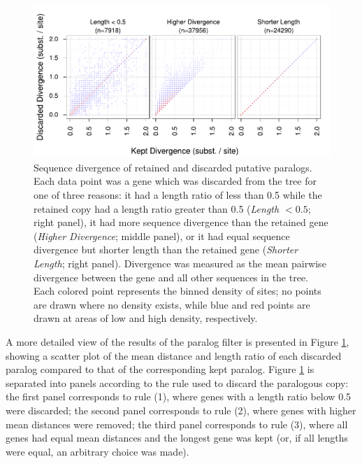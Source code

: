 \begin{figure}
\centering
\includegraphics[scale=0.9]{Figs/mammals_paralogs_scatter.pdf}
\caption{Sequence divergence of retained and discarded putative
  paralogs. Each data point was a gene which was discarded from the
  tree for one of three reasons: it had a length ratio of less than
  0.5 while the retained copy had a length ratio greater than 0.5
  (\emph{Length $<0.5$}; right panel), it had more sequence divergence
  than the retained gene (\emph{Higher Divergence}; middle panel), or
  it had equal sequence divergence but shorter length than the
  retained gene (\emph{Shorter Length}; right panel). Divergence was
  measured as the mean pairwise divergence between the gene and all
  other sequences in the tree. Each colored point represents the
  binned density of sites; no points are drawn where no density
  exists, while blue and red points are drawn at areas of low and high
  density, respectively.}
\label{filtered_paralogs_scatter}
\end{figure}

A more detailed view of the results of the paralog filter is presented
in Figure \ref{filtered_paralogs_scatter}, showing a scatter plot of
the mean distance and length ratio of each discarded paralog compared
to that of the corresponding kept paralog. Figure
\ref{filtered_paralogs_scatter} is separated into panels according to
the rule used to discard the paralogous copy: the first panel
corresponds to rule (1), where genes with a length ratio below 0.5
were discarded; the second panel corresponds to rule (2), where genes
with higher mean distances were removed; the third panel corresponds
to rule (3), where all genes had equal mean distances and the longest
gene was kept (or, if all lengths were equal, an arbitrary choice was
made).

